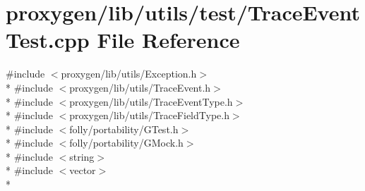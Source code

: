 \section{proxygen/lib/utils/test/\+Trace\+Event\+Test.cpp File Reference}
\label{TraceEventTest_8cpp}
{\ttfamily \#include $<$proxygen/lib/utils/\+Exception.\+h$>$}\\*
{\ttfamily \#include $<$proxygen/lib/utils/\+Trace\+Event.\+h$>$}\\*
{\ttfamily \#include $<$proxygen/lib/utils/\+Trace\+Event\+Type.\+h$>$}\\*
{\ttfamily \#include $<$proxygen/lib/utils/\+Trace\+Field\+Type.\+h$>$}\\*
{\ttfamily \#include $<$folly/portability/\+G\+Test.\+h$>$}\\*
{\ttfamily \#include $<$folly/portability/\+G\+Mock.\+h$>$}\\*
{\ttfamily \#include $<$string$>$}\\*
{\ttfamily \#include $<$vector$>$}\\*
